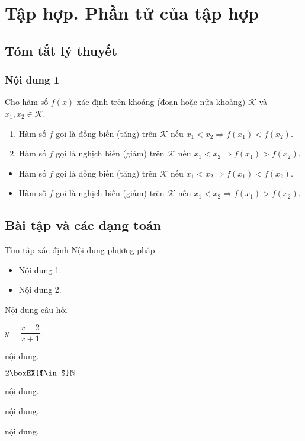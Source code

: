 \section{Tập hợp. Phần tử của tập hợp}
\subsection{Tóm tắt lý thuyết}

\begin{tomtat}
\subsubsection{Nội dung 1}
\begin{dn}
Cho hàm số $f(x)$ xác định trên khoảng (đoạn hoặc nửa khoảng) $\mathcal{K}$ và $x_1,x_2\in \mathcal K$.
\begin{enumerate}
	\item Hàm số $f$ gọi là đồng biến (tăng) trên $\mathcal K$ nếu $x_1<x_2\Rightarrow f(x_1)<f(x_2)$.
	\item Hàm số $f$ gọi là nghịch biến (giảm) trên $\mathcal K$ nếu $x_1<x_2\Rightarrow f(x_1)>f(x_2)$.
\end{enumerate}
\end{dn}
\begin{note}\hfill
	\begin{itemize}
		\item Hàm số $f$ gọi là đồng biến (tăng) trên $\mathcal K$ nếu $x_1<x_2\Rightarrow f(x_1)<f(x_2)$.
		\item Hàm số $f$ gọi là nghịch biến (giảm) trên $\mathcal K$ nếu $x_1<x_2\Rightarrow f(x_1)>f(x_2)$.
	\end{itemize}
\end{note}
\end{tomtat}

\subsection{Bài tập và các dạng toán}

\begin{dang}{Tìm tập xác định}
	Nội dung phương pháp
	\begin{itemize}
		\item Nội dung 1.
		\item Nội dung 2.
	\end{itemize}
\end{dang}

\begin{vd}
Nội dung câu hỏi
\begin{listEX}[2]
	\item $y=\dfrac{x-2}{x+1}$. 
	\item nội dung. 
	\item $2\boxEX{$\in$}\mathbb{N}$
	\item nội dung.
	\item nội dung.
	\item nội dung.
\end{listEX}
\end{vd}

